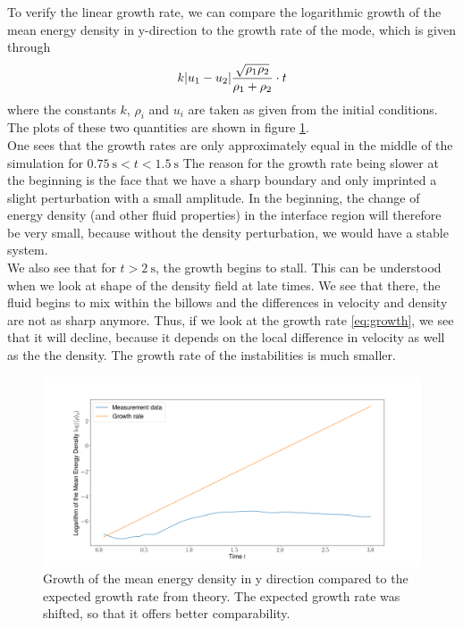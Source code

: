 \documentclass{scrartcl}
\begin{document}
To verify the linear growth rate, we can compare the logarithmic growth of the mean energy density in y-direction to the growth rate of the mode, which is given through
\begin{equation}\label{eq:growth}
	k \abs{u_1 - u_2}\frac{\sqrt{\rho_1\rho_2}}{\rho_1 + \rho_2} \cdot t
\end{equation}
where the constants \( k \), \( \rho_i \) and \( u_i \) are taken as given from the initial conditions.
The plots of these two quantities are shown in figure \ref{fig:growth}.\\
One sees that the growth rates are only approximately equal in the middle of the simulation for \( \SI{0.75}{\second}< t < \SI{1.5}{\second}\)
The reason for the growth rate being slower at the beginning is the face that we have a sharp boundary and only imprinted a slight perturbation with a small amplitude.
In the beginning, the change of energy density (and other fluid properties) in the interface region will therefore be very small, because without the density perturbation, we would have a stable system. \\
We also see that for \( t > \SI{2}{\second} \), the growth begins to stall.
This can be understood when we look at shape of the density field at late times.
We see that there, the fluid begins to mix within the billows and the differences in velocity and density are not as sharp anymore.
Thus, if we look at the growth rate \ref{eq:growth}, we see that it will decline, because it depends on the local difference in velocity as well as the the density.
The growth rate of the instabilities is much smaller.

\begin{figure}
	\centering
	\includegraphics[width=0.9\linewidth]{../Growth}
	\caption{Growth of the mean energy density in y direction compared to the expected growth rate from theory.
	The expected growth rate was shifted, so that it offers better comparability.}
	\label{fig:growth}
\end{figure}
\end{document}

